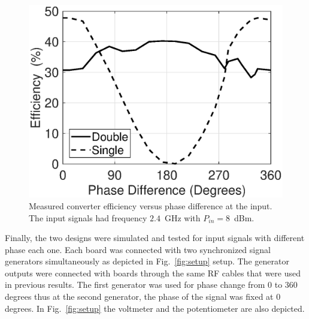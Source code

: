 \documentclass[journal]{IEEEtran}
\begin{document}
\begin{figure}[t]
\centering
\includegraphics[width=0.9\columnwidth]{Figures/Fig16.eps}
\caption{Measured converter efficiency 
 versus phase difference at the input. 
 The  input signals had frequency $2.4$~GHz  with $P_{in}=8$~dBm. }
\label{fig:eff_vs_phase_8}
\end{figure}


Finally, the two designs were simulated and tested for input signals with different phase each one. 
%
Each board was connected with two synchronized signal
generators simultaneously as depicted in Fig.~\ref{fig:setup} setup.
%
The generator outputs were connected with boards 
through the same RF cables that were used in previous results. 
%
The first generator was used for
phase change from $0$ to $360$ degrees thus at the second generator,
the phase of the  signal was fixed at $0$ degrees.
%
In Fig.~\ref{fig:setup}  the voltmeter and the potentiometer are also depicted. %
\end{document}
